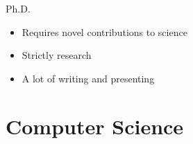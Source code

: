 \documentclass{beamer}
\begin{document}
\begin{frame}{Ph.D.}
\begin{itemize}
	\item Requires novel contributions to science
	\item Strictly research
	\item A lot of writing and presenting
\end{itemize}
\end{frame}

\section{Computer Science}
\end{document}
